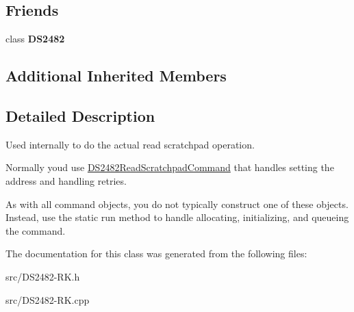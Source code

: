 \subsection*{Friends}
\begin{DoxyCompactItemize}
\item 
\mbox{\label{class_d_s2482_read_scratchpad_internal_afeaf69274324e8dbeebede05c02d9c18}} 
class {\bfseries D\+S2482}
\end{DoxyCompactItemize}
\subsection*{Additional Inherited Members}


\subsection{Detailed Description}
Used internally to do the actual read scratchpad operation. 

Normally you\textquotesingle{}d use \mbox{\hyperlink{class_d_s2482_read_scratchpad_command}{D\+S2482\+Read\+Scratchpad\+Command}} that handles setting the address and handling retries.

As with all command objects, you do not typically construct one of these objects. Instead, use the static run method to handle allocating, initializing, and queueing the command. 

The documentation for this class was generated from the following files\+:\begin{DoxyCompactItemize}
\item 
src/D\+S2482-\/\+R\+K.\+h\item 
src/D\+S2482-\/\+R\+K.\+cpp\end{DoxyCompactItemize}
